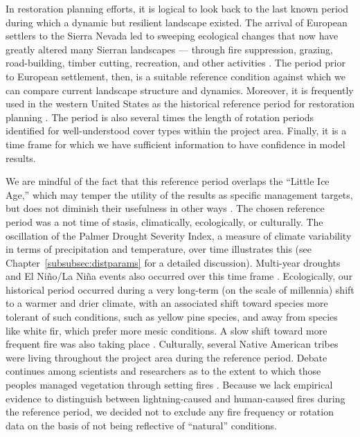 In restoration planning efforts, it is logical to look back to the last known period during which a dynamic but resilient landscape existed. The arrival of European settlers to the Sierra Nevada led to sweeping ecological changes that now have greatly altered many Sierran landscapes --- through fire suppression, grazing, road-building, timber cutting, recreation, and other activities \citep{Storer1963,Stephens2015,Knapp2013,Hessburg2005}. The period prior to European settlement, then, is a suitable reference condition against which we can compare current landscape structure and dynamics. Moreover, it is frequently used in the western United States as the historical reference period for restoration planning \citep{VandeWater2011,Safford2013,Meyer2013}. The period is also several times the length of rotation periods identified for well-understood cover types within the project area. Finally, it is a time frame for which we have sufficient information to have confidence in model results. 

We are mindful of the fact that this reference period overlaps the ``Little Ice Age,'' which may temper the utility of the results as specific management targets, but does not diminish their usefulness in other ways \citep{Minnich2007,Safford2013}. The chosen reference period was a not time of stasis, climatically, ecologically, or culturally. The oscillation of the Palmer Drought Severity Index, a measure of climate variability in terms of precipitation and temperature, over time illustrates this (see Chapter~\ref{subsubsec:distparams} for a detailed discussion). Multi-year droughts and El Ni\~no/La Ni\~na events also occurred over this time frame \citep{Minnich2007}. Ecologically, our historical period occurred during a very long-term (on the scale of millennia) shift to a warmer and drier climate, with an associated shift toward species more tolerant of such conditions, such as yellow pine species, and away from species like white fir, which prefer more mesic conditions. A slow shift toward more frequent fire was also taking place \citep{Safford2013}. Culturally, several Native American tribes were living throughout the project area during the reference period. Debate continues among scientists and researchers as to the extent to which those peoples managed vegetation through setting fires \citep{Anderson1996}. Because we lack empirical evidence to distinguish between lightning-caused and human-caused fires during the reference period, we decided not to exclude any fire frequency or rotation data on the basis of not being reflective of ``natural'' conditions. 

